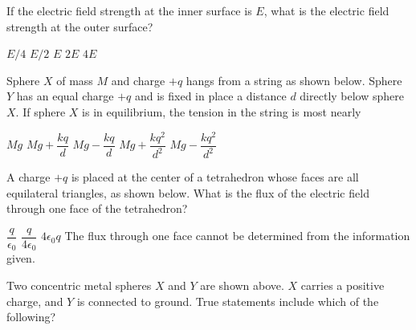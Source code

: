 \documentclass[12pt]{../oss-classkick-exam}
\begin{document}
\begin{questions}
  \question If the electric field strength at the inner surface is $E$, what is
  the electric field strength at the outer surface?
  \begin{choices}
    \choice $E/4$
    \choice $E/2$
    \choice $E$
    \choice $2E$
    \choice $4E$
  \end{choices}
  \label{sphere2}
  
  \uplevel{\rule{\linewidth}{.5pt}}
  
  \question Sphere $X$ of mass $M$ and charge $+q$ hangs from a string as shown
  below. Sphere $Y$ has an equal charge $+q$ and is fixed in place a distance
  $d$ directly below sphere $X$. If sphere $X$ is in equilibrium, the tension
  in the string is most nearly

  \begin{minipage}{.35\linewidth}
  \end{minipage}
  \begin{minipage}{.5\linewidth}
    \begin{choices}
      \choice $Mg$
      \choice $Mg+\dfrac{kq}d$
      \choice $Mg-\dfrac{kq}d$
      \choice $Mg+\dfrac{kq^2}{d^2}$
      \choice $Mg-\dfrac{kq^2}{d^2}$
    \end{choices}
  \end{minipage}
  \newpage

  \question A charge $+q$ is placed at the center of a tetrahedron whose faces
  are all equilateral triangles, as shown below. What is the flux of the
  electric field through one face of the tetrahedron?
  \begin{choices}
    \choice $\dfrac{q}{\epsilon_0}$
    \choice $\dfrac{q}{4\epsilon_0}$
    \choice $4\epsilon_0q$
    \choice The flux through one face cannot be determined from the
    information given.
  \end{choices}

  
  \question Two concentric metal spheres $X$ and $Y$ are shown above. $X$
  carries a positive charge, and $Y$ is connected to ground. True statements
  include which of the following?


\end{questions}
\end{document}
